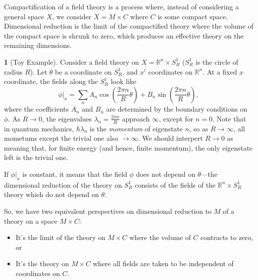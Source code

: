 \documentclass[oneside,english]{amsbook}
\numberwithin{section}{chapter}
\numberwithin{equation}{section}
\numberwithin{figure}{section}
\theoremstyle{plain}
\theoremstyle{definition}
\theoremstyle{remark}
\theoremstyle{definition}
\newtheorem*{example*}{\protect\examplename}
\theoremstyle{definition}
\theoremstyle{plain}
\providecommand{\examplename}{Example}
\begin{document}
Compactification of a field theory is a process where, instead of
considering a general space $X$, we consider $X=M\times C$ where
$C$ is some compact space. Dimensional reduction is the limit of
the compactified theory where the volume of the compact space is shrunk
to zero, which produces an effective theory on the remaining dimensions.
\begin{example*}
[Toy Example] Consider a field theory on $X=\mathbb{R}^{n}\times S_{R}^{1}$
($S_{R}^{1}$ is the circle of radius $R$). Let $\theta$ be a coordinate
on $S_{R}^{1}$, and $x^{i}$ coordinates on $\mathbb{R}^{n}$. At
a fixed $x$ coordinate, the fields along the $S_{R}^{1}$ look like
\[
\phi|_{x}=\sum_{n}A_{n}\cos\left(\frac{2\pi n}{R}\theta\right)+B_{n}\sin\left(\frac{2\pi n}{R}\theta\right),
\]
where the coefficients $A_{n}$ and $B_{n}$ are determined by the
boundary conditions on $\phi$. As $R\rightarrow0$, the eigenvalues
$\lambda_{n}=\frac{2\pi n}{R}$ approach $\infty$, except for $n=0$.
Note that in quantum mechanics, $\hbar\lambda_{n}$ is the \emph{momentum}
of eigenstate $n$, so as $R\rightarrow\infty$, all mometums except
the trivial one also $\rightarrow\infty$. We should interpert $R\rightarrow0$
as meaning that, for finite energy (and hence, finite momentum), the
only eigenstate left is the trivial one.

If $\phi|_{x}$ is constant, it means that the field $\phi$ does
not depend on $\theta$---the dimensional reduction of the theory
on $S_{R}^{1}$ consists of the fields of the $\mathbb{R}^{n}\times S_{R}^{1}$
theory which do not depend on $\theta$.
\end{example*}
So, we have two equivalent perspectives on dimensional reduction to
$M$ of a theory on a space $M\times C$:
\begin{itemize}
\item It's the limit of the theory on $M\times C$ where the volume of $C$
contracts to zero, or
\item It's the theory on $M\times C$ where all fields are taken to be independent
of coordinates on $C$.
\end{itemize}
\end{document}
